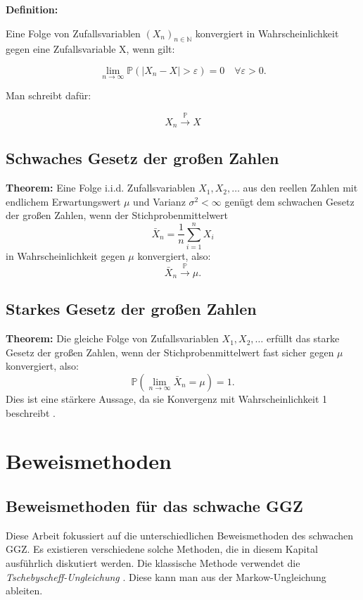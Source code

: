 \documentclass[aodsor,preprint]{imsart}
\numberwithin{equation}{section}
\theoremstyle{plain}
\begin{document}
\textbf{Definition:}

Eine Folge von Zufallsvariablen $(X_{n})_{n\in \mathbb{N}}$ konvergiert in Wahrscheinlichkeit gegen eine Zufallsvariable X, wenn gilt:

$$ \lim_{n \to \infty} \mathbb{P}(|X_n - X| > \varepsilon) = 0 \quad \forall \varepsilon > 0. $$

Man schreibt dafür:

$$ X_{n} \xrightarrow{\mathbb{P}} X $$

\subsection{Schwaches Gesetz der großen Zahlen}
\textbf{Theorem:}  
Eine Folge i.i.d. Zufallsvariablen \( X_1, X_2, \dots \) aus den reellen Zahlen mit endlichem Erwartungswert \( \mu \) und Varianz \( \sigma^2 < \infty \) genügt dem schwachen Gesetz der großen Zahlen, wenn der Stichprobenmittelwert
\[
\bar{X}_n = \frac{1}{n} \sum_{i=1}^n X_i
\]
in Wahrscheinlichkeit gegen \( \mu \) konvergiert, also:
\[
\bar{X}_n \xrightarrow{\mathbb{P}} \mu.
\]

\subsection{Starkes Gesetz der großen Zahlen}

\textbf{Theorem:}  
Die gleiche Folge von Zufallsvariablen \( X_1, X_2, \dots \) erfüllt das starke Gesetz der großen Zahlen, wenn der Stichprobenmittelwert fast sicher gegen \( \mu \) konvergiert, also:
\[
\mathbb{P} \left( \lim_{n \to \infty} \bar{X}_n = \mu \right) = 1.
\]
Dies ist eine stärkere Aussage, da sie Konvergenz mit Wahrscheinlichkeit 1 beschreibt \citep{degroot2021}.


\section{Beweismethoden}
\label{sec:beweismethoden}


\subsection{Beweismethoden für das schwache GGZ}
\label{sec:beweisschwach}

Diese Arbeit fokussiert auf die unterschiedlichen Beweismethoden des schwachen GGZ.
Es existieren verschiedene solche Methoden, die in diesem Kapital ausführlich diskutiert werden.
Die klassische Methode verwendet die \textit{Tschebyscheff-Ungleichung} \citep{chebyshev1867}. Diese kann man aus der Markow-Ungleichung ableiten.
\end{document}
